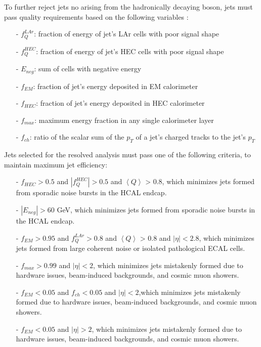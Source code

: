 To further reject jets no arising from the hadronically decaying boson, jets must pass quality requirements based on the following variables \cite{jet_selection}:

\begin{itemize}
\item[-] $f_{Q}^{LAr}$: fraction of energy of jet's LAr cells with poor signal shape
\item[-] $f_{Q}^{HEC}$: fraction of energy of jet's HEC cells with poor signal shape
\item[-] $E_{neg}$: sum of cells with negative energy
\item[-] $f_{EM}$: fraction of jet's energy deposited in EM calorimeter
\item[-] $f_{HEC}$: fraction of jet's energy deposited in HEC calorimeter
\item[-] $f_{max}$: maximum energy fraction in any single calorimeter layer
\item[-] $f_{ch}$: ratio of the scalar sum of the $p_{T}$ of a jet's charged tracks to the jet's $p_{T}$
\end{itemize}

Jets selected for the resolved analysis must pass one of the following criteria, to maintain maximum jet efficiency:

\begin{itemize}
\item[-] $f_{HEC} > 0.5$ and $|f_{Q}^{HEC}| > 0.5$ and $\left\langle Q \right\rangle $ > 0.8, which minimizes jets formed from sporadic noise bursts in the HCAL endcap.
\item[-] $|E_{neg}| > 60$ GeV, which minimizes jets formed from sporadic noise bursts in the HCAL endcap.
\item[-] $f_{EM} > 0.95$ and $f_{Q}^{LAr} > 0.8$ and $\left\langle Q \right\rangle $ > 0.8 and $|\eta| < 2.8$, which minimizes jets formed from large coherent noise or isolated pathological ECAL cells.
\item[-] $f_{max} > 0.99$ and $|\eta| < 2$, which minimizes jets mistakenly formed due to hardware issues, beam-induced backgrounds, and cosmic muon showers.
\item[-] $f_{EM} < 0.05$ and $f_{ch} < 0.05$ and $|\eta| < 2$,which minimizes jets mistakenly formed due to hardware issues, beam-induced backgrounds, and cosmic muon showers.
\item[-] $f_{EM} < 0.05$ and  $|\eta| > 2$, which minimizes jets mistakenly formed due to hardware issues, beam-induced backgrounds, and cosmic muon showers.
\end{itemize}



